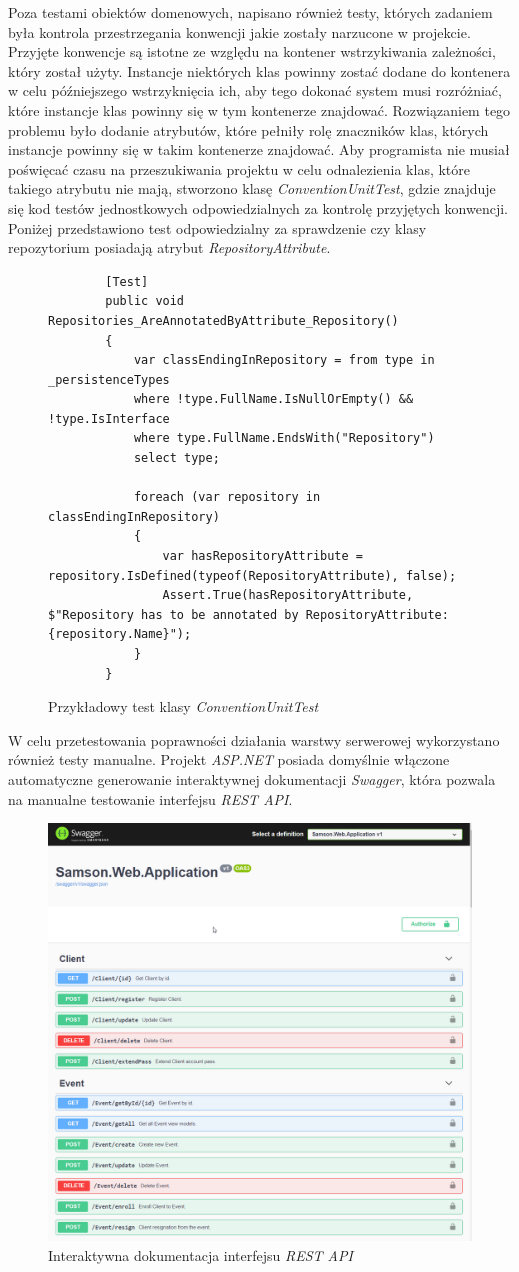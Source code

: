 \documentclass[a4paper,twoside,12pt]{book}
\begin{document}
Poza testami obiektów domenowych, napisano również testy, których zadaniem była kontrola przestrzegania konwencji jakie zostały narzucone w projekcie. Przyjęte konwencje są istotne ze względu na kontener wstrzykiwania zależności, który został użyty. Instancje niektórych klas powinny zostać dodane do kontenera w celu późniejszego wstrzyknięcia ich, aby tego dokonać system musi rozróżniać, które instancje klas powinny się w tym kontenerze znajdować. Rozwiązaniem tego problemu było dodanie atrybutów, które pełniły rolę znaczników klas, których instancje powinny się w takim kontenerze znajdować. Aby programista nie musiał poświęcać czasu na przeszukiwania projektu w celu odnalezienia klas, które takiego atrybutu nie mają, stworzono klasę \textit{ConventionUnitTest}, gdzie znajduje się kod testów jednostkowych odpowiedzialnych za kontrolę przyjętych konwencji. Poniżej przedstawiono test odpowiedzialny za sprawdzenie czy klasy repozytorium posiadają atrybut \textit{RepositoryAttribute}.
\begin{figure} [H]
	\centering
	\begin{lstlisting}
        [Test]
		public void Repositories_AreAnnotatedByAttribute_Repository()
		{
			var classEndingInRepository = from type in _persistenceTypes
			where !type.FullName.IsNullOrEmpty() && !type.IsInterface
			where type.FullName.EndsWith("Repository")
			select type;
			
			foreach (var repository in classEndingInRepository)
			{
				var hasRepositoryAttribute = repository.IsDefined(typeof(RepositoryAttribute), false);
				Assert.True(hasRepositoryAttribute, $"Repository has to be annotated by RepositoryAttribute: {repository.Name}");
			}
		}
	\end{lstlisting}
	\caption{Przykładowy test klasy \textit{ConventionUnitTest}}
	\label{fig:repositoryAttributeUnitTest}
\end{figure}
W celu przetestowania poprawności działania warstwy serwerowej wykorzystano również testy manualne. Projekt \textit{ASP.NET} posiada domyślnie włączone automatyczne generowanie interaktywnej dokumentacji \textit{Swagger}, która pozwala na manualne testowanie interfejsu \textit{REST API}.
\begin{figure}[H]
	\centering
	\includegraphics[width=0.7\linewidth]{../zrzuty_ekranu/testy/swagger}
	\caption{Interaktywna dokumentacja interfejsu \textit{REST API}}
	\label{fig:swagger}
\end{figure}
\end{document}
